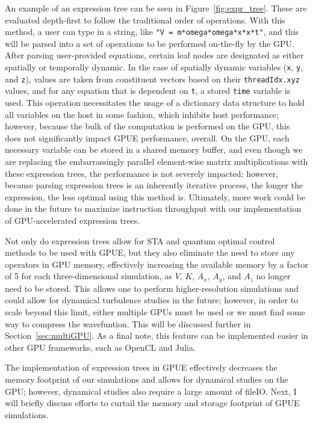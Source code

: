 An example of an expression tree can be seen in Figure~\ref{fig:expr_tree}.
These are evaluated depth-first to follow the traditional order of operations.
With this method, a user can type in a string, like \texttt{"V = m*omega*omega*x*x*t"}, and this will be parsed into a set of operations to be performed on-the-fly by the GPU.
After parsing user-provided equations, certain leaf nodes are designated as either spatially or temporally dynamic.
In the case of spatially dynamic variables (\texttt{x}, \texttt{y}, and \texttt{z}), values are taken from constituent vectors based on their \texttt{threadIdx.xyz} values, and for any equation that is dependent on \texttt{t}, a stored \texttt{time} variable is used.
This operation necessitates the usage of a dictionary data structure to hold all variables on the host in some fashion, which inhibits host performance; however, because the bulk of the computation is performed on the GPU, this does not significantly impact GPUE performance, overall.
On the GPU, each necessary variable can be stored in a shared memory buffer, and even though we are replacing the embarrassingly parallel element-wise matrix multiplications with these expression trees, the performance is not severely impacted; however,
because parsing expression trees is an inherently iterative process, the longer the expression, the less optimal using this method is.
Ultimately, more work could be done in the future to maximize instruction throughput with our implementation of GPU-accelerated expression trees.

Not only do expression trees allow for STA and quantum optimal control methods to be used with GPUE, but they also eliminate the need to store any operators in GPU memory, effectively increasing the available memory by a factor of 5 for each three-dimensional simulation, as $V$, $K$, $A_x$, $A_y$, and $A_z$ no longer need to be stored.
This allows one to perform higher-resolution simulations and could allow for dynamical turbulence studies in the future; however, in order to scale beyond this limit, either multiple GPUs must be used or we must find some way to compress the wavefuntion.
This will be discussed further in Section~\ref{sec:multiGPU}.
As a final note, this feature can be implemented easier in other GPU frameworks, such as OpenCL and Julia.

The implementation of expression trees in GPUE effectively decreases the memory footprint of our simulations and allows for dynamical studies on the GPU; however, dynamical studies also require a large amount of fileIO.
Next, I will briefly discuss efforts to curtail the memory and storage footprint of GPUE simulations.

